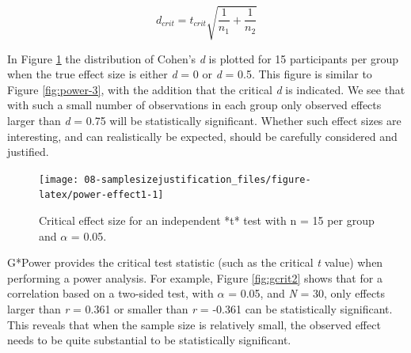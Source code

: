 \documentclass[
  oneside]{book}
\begin{document}
\[d_{crit} = t_{crit}{\sqrt{\frac{1}{n_1} + \frac{1}{n_2}}}\]

In Figure \ref{fig:power-effect1} the distribution of Cohen's \emph{d} is plotted for 15 participants per group when the true effect size is either \emph{d} = 0 or \emph{d} = 0.5. This figure is similar to Figure \ref{fig:power-3}, with the addition that the critical \emph{d} is indicated. We see that with such a small number of observations in each group only observed effects larger than \emph{d} = 0.75 will be statistically significant. Whether such effect sizes are interesting, and can realistically be expected, should be carefully considered and justified.

\begin{figure}

{\centering \texttt{[image: 08-samplesizejustification\_files/figure-latex/power-effect1-1]} 

}

\caption{Critical effect size for an independent *t* test with n = 15 per group and $\alpha$ = 0.05.}\label{fig:power-effect1}
\end{figure}

G*Power provides the critical test statistic (such as the critical \emph{t} value) when performing a power analysis. For example, Figure \ref{fig:gcrit2} shows that for a correlation based on a two-sided test, with \(\alpha\) = 0.05, and \emph{N} = 30, only effects larger than \emph{r} = 0.361 or smaller than \emph{r} = -0.361 can be statistically significant. This reveals that when the sample size is relatively small, the observed effect needs to be quite substantial to be statistically significant.
\end{document}
